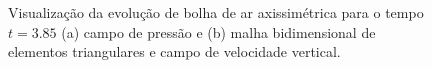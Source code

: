 \documentclass[a4paper,portuges,12pt]{article}
\begin{document}
 \begin{figure}[h]
 	\begin{center}
		\hspace{0.7cm}
 	\end{center}
	\caption{Visualização da evolução de bolha de ar axissimétrica para
	o tempo $t=3.85$ (a) campo de pressão e (b) malha bidimensional de
	elementos triangulares e campo de velocidade vertical.} 
	\label{fig:micro2} 
 \end{figure}
\end{document}
